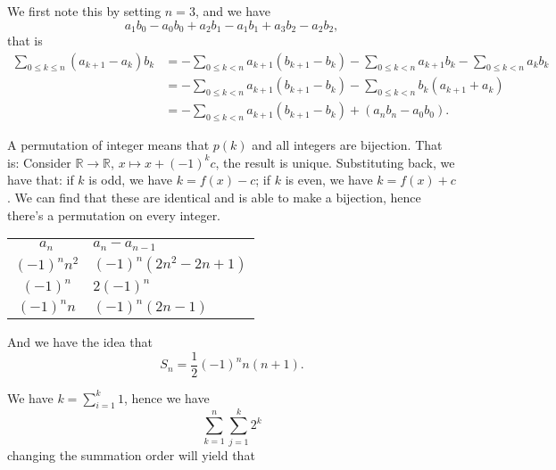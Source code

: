  We first note this by setting $n = 3$, and we have 
\[
    a_1b_0-a_0b_0+a_2b_1-a_1b_1+a_3b_2-a_2b_2,
\]
that is 
\begin{align*}
    \sum_{0\leq k\leq n}^{} (a_{k+1}-a_k)b_k &= 
    -\sum_{0\leq k<n}^{}a_{k+1} (b_{k+1}-b_k)-\sum_{0\leq k<n}^{} a_{k+1}b_k
    -\sum_{0\leq k<n}^{} a_kb_k\\
    &= -\sum_{0\leq k<n}^{}a_{k+1}(b_{k+1}-b_k) - 
      \sum_{0\leq k<n}^{} b_k (a_{k+1} + a_k)\\
    &=  -\sum_{0\leq k<n}^{}a_{k+1}(b_{k+1}-b_k) + (a_n b_n - a_0b_0). 
\end{align*}

 A permutation of integer means that $p(k)$ and all integers 
are bijection. That is: Consider $\mathbb R \to \mathbb R$, $x\mapsto x+(-1)^kc$, the result is 
unique. Substituting back, we have that: if $k$ is odd, we have $k=f(x)-c$; 
if $ k$ is even, we have $k=f(x)+c$. We can find that these are identical
and is able to make a bijection, hence there's a permutation on every
integer. 


\begin{tabular}{c|l}
    $a_n$ & $a_n-a_{n-1}$ \\
    $(-1)^nn^2$ & $(-1)^n(2n^2 -2n+1)$\\
    $(-1)^n$ & $2(-1)^n$ \\
    $(-1)^nn$ & $(-1)^n(2n-1)$
\end{tabular}

And we have the idea that 
\[
    S_n = \frac{1}{2}(-1)^n n(n+1). 
\]

 We have $k=\sum_{i=1}^{k} 1 $, hence we have 
\[
    \sum_{k=1}^{n} \sum_{j=1}^{k} 2^k
\]
changing the summation order will yield that 




